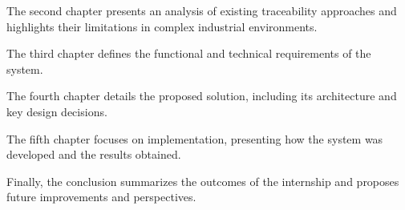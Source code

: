 The second chapter presents an analysis of existing traceability approaches
and highlights their limitations in complex industrial environments.

The third chapter defines the functional and technical requirements of the system.

The fourth chapter details the proposed solution, including its architecture
and key design decisions.

The fifth chapter focuses on implementation, presenting how the system was
developed and the results obtained.

Finally, the conclusion summarizes the outcomes of the internship and proposes
future improvements and perspectives.